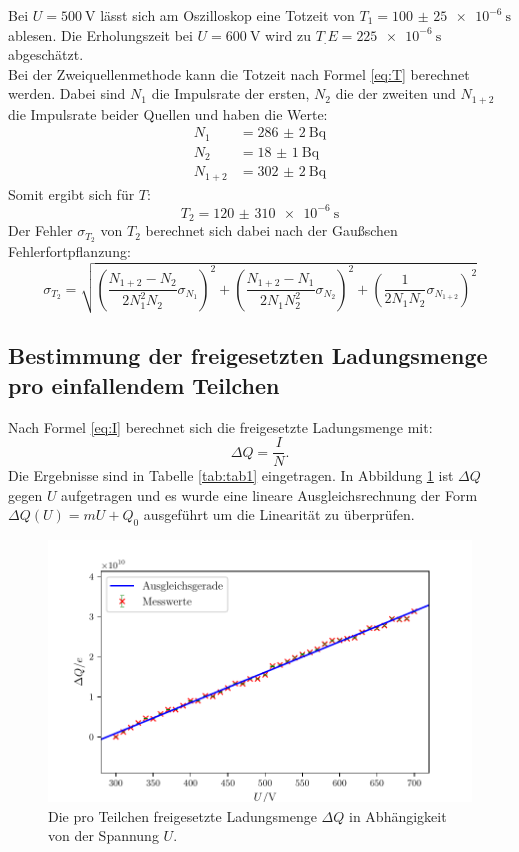 Bei $U=\SI{500}{\volt}$ lässt sich am Oszilloskop eine Totzeit von $T_1=\SI{100(25)e-6}{\second}$ ablesen. Die Erholungszeit bei $U=\SI{600}{\volt}$ wird zu $T_.E=\SI{225e-6}{\second}$ abgeschätzt.\\
Bei der Zweiquellenmethode kann die Totzeit nach Formel \eqref{eq:T} berechnet werden. Dabei sind $N_1$ die Impulsrate der ersten, $N_2$ die der zweiten und $N_{1+2}$ die Impulsrate beider Quellen und haben die Werte:
\begin{align*}
N_1 	&= \SI{286(2)}{\becquerel}\\
N_2 	&= \SI{18(1)}{\becquerel}\\
N_{1+2}	&= \SI{302(2)}{\becquerel}
\end{align*} 
Somit ergibt sich für $T$:
\begin{equation*}
T_2 = \SI{120(310)e-6}{\second}
\end{equation*}
Der Fehler $\sigma_{T_2}$ von $T_2$ berechnet sich dabei nach der Gaußschen Fehlerfortpflanzung:
\begin{equation}
\sigma_{T_2} = \sqrt{\left(\frac{N_{1+2}-N_2}{2N_1^2N_2}\sigma_{N_1}\right)^2+\left(\frac{N_{1+2}-N_1}{2N_1N_2^2}\sigma_{N_2}\right)^2+\left(\frac{1}{2N_1N_2}\sigma_{N_{1+2}}\right)^2}
\end{equation}



\subsection{Bestimmung der freigesetzten Ladungsmenge pro einfallendem Teilchen}

Nach Formel \eqref{eq:I} berechnet sich die freigesetzte Ladungsmenge mit:
\begin{equation*}
\Delta Q = \frac{I}{N} \text{.}
\end{equation*}
Die Ergebnisse sind in Tabelle \ref{tab:tab1} eingetragen. In Abbildung \ref{fig:Graph2} ist $\Delta Q$ gegen $U$ aufgetragen und es wurde eine lineare Ausgleichsrechnung der Form $\Delta Q(U) = mU+Q_0$ ausgeführt um die Linearität zu überprüfen. 

\begin{figure}
	\centering
	\includegraphics[width=\linewidth-50pt,height=\textheight-50pt,keepaspectratio]{content/images/Graph2.pdf}
	\caption{Die pro Teilchen freigesetzte Ladungsmenge $\Delta Q$ in Abhängigkeit von der Spannung $U$.}
	\label{fig:Graph2}
\end{figure}